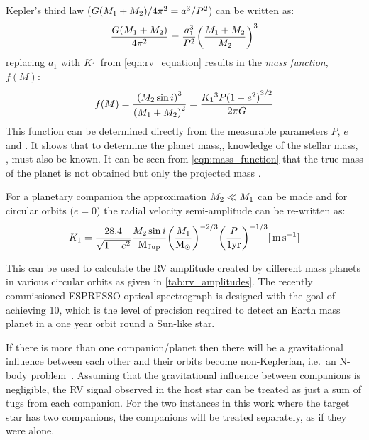 Kepler's third law (\({G (\mone + \mtwo)}/{4\pi^{2}}= {a}^{3}/{P}^{2}\)) can be written as:
\begin{equation}
    \frac{G (\mone{} + \mtwo{})}{4\pi^{2}} = \frac{a_{1}^{3}}{P^{2}}{\left(\frac{\mone{} + \mtwo}{\mtwo}\right)}^{3}
\end{equation}
replacing $a_{1}$ with $\kone$ from \cref{eqn:rv_equation} results in the \emph{mass function}, $f(M)$:
\begin{equation}
    f(M) = \frac{{(\mtwosini)}^{3}}{{(\mone{} + \mtwo{})}^{2}} = \frac{\kone{}^{3} P {(\oneminusetwo)}^{3/2}}{2 \pi G} \label{eqn:mass_function}
\end{equation}
This function can be determined directly from the measurable parameters \(P\), \(e\) and \Kone{}.
It shows that to determine the planet mass,\Mtwo{}, knowledge of the stellar mass, \Mone{}, must also be known.
It can be seen from \cref{eqn:mass_function} that the true mass of the planet \Mtwo{} is not obtained but only the projected mass \Mtwosini{}.

For a planetary companion the approximation \(\mtwo{} \ll \mone{}\) can be made and for circular orbits (\(e=0\)) the radial velocity semi-amplitude can be re-written as:
\begin{equation}
    \kone{}=\frac{28.4}{\sqrt{\oneminusetwo}} \frac{\mtwosini}{\mjup} {\left(\frac{\mone}{\modot}\right)}^{-2/3} {\left(\frac{P}{1 \si{yr}}\right)}^{-1/3}  [\mps] \label{eqn:k_relation}
\end{equation}

This can be used to calculate the {RV} amplitude created by different mass planets in various circular orbits as given in \cref{tab:rv_amplitudes}.
The recently commissioned ESPRESSO optical spectrograph is designed with the goal of achieving 10\cmps{}, which is the level of precision required to detect an Earth mass planet in a one year orbit round a Sun-like star.



If there is more than one companion/planet then there will be a gravitational influence between each other and their orbits become non-Keplerian, i.e.\ an N-body problem~\citep[e.g.][]{chenciner_three_2007, correia_chaotic_2018, gao_numerical_2018, lillo-box_troy_2018, leleu_coorbital_2019}.
Assuming that the gravitational influence between companions is negligible, the {RV} signal observed in the host star can be treated as just a sum of tugs from each companion.
For the two instances in this work where the target star has two companions, the companions will be treated separately, as if they were alone.


